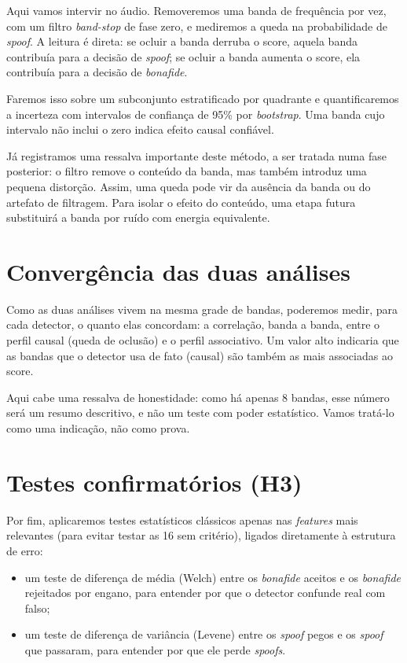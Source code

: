 \documentclass[11pt,a4paper]{article}
\begin{document}
Aqui vamos intervir no áudio. Removeremos uma banda de frequência por vez, com um
filtro \emph{band-stop} de fase zero, e mediremos a queda na probabilidade de
\emph{spoof}. A leitura é direta: se ocluir a banda derruba o score, aquela banda
contribuía para a decisão de \emph{spoof}; se ocluir a banda aumenta o score, ela
contribuía para a decisão de \emph{bonafide}.

Faremos isso sobre um subconjunto estratificado por quadrante e quantificaremos a
incerteza com intervalos de confiança de 95\% por \emph{bootstrap}. Uma banda cujo
intervalo não inclui o zero indica efeito causal confiável.

Já registramos uma ressalva importante deste método, a ser tratada numa fase
posterior: o filtro remove o conteúdo da banda, mas também introduz uma pequena
distorção. Assim, uma queda pode vir da ausência da banda ou do artefato de
filtragem. Para isolar o efeito do conteúdo, uma etapa futura substituirá a banda
por ruído com energia equivalente.

\section{Convergência das duas análises}

Como as duas análises vivem na mesma grade de bandas, poderemos medir, para cada
detector, o quanto elas concordam: a correlação, banda a banda, entre o perfil
causal (queda de oclusão) e o perfil associativo. Um valor alto indicaria que as
bandas que o detector usa de fato (causal) são também as mais associadas ao score.

Aqui cabe uma ressalva de honestidade: como há apenas 8 bandas, esse número será
um resumo descritivo, e não um teste com poder estatístico. Vamos tratá-lo como
uma indicação, não como prova.

\section{Testes confirmatórios (H3)}

Por fim, aplicaremos testes estatísticos clássicos apenas nas \emph{features} mais
relevantes (para evitar testar as 16 sem critério), ligados diretamente à
estrutura de erro:

\begin{itemize}
  \item um teste de diferença de média (Welch) entre os \emph{bonafide} aceitos e
        os \emph{bonafide} rejeitados por engano, para entender por que o detector
        confunde real com falso;
  \item um teste de diferença de variância (Levene) entre os \emph{spoof} pegos e
        os \emph{spoof} que passaram, para entender por que ele perde \emph{spoofs}.
\end{itemize}
\end{document}
